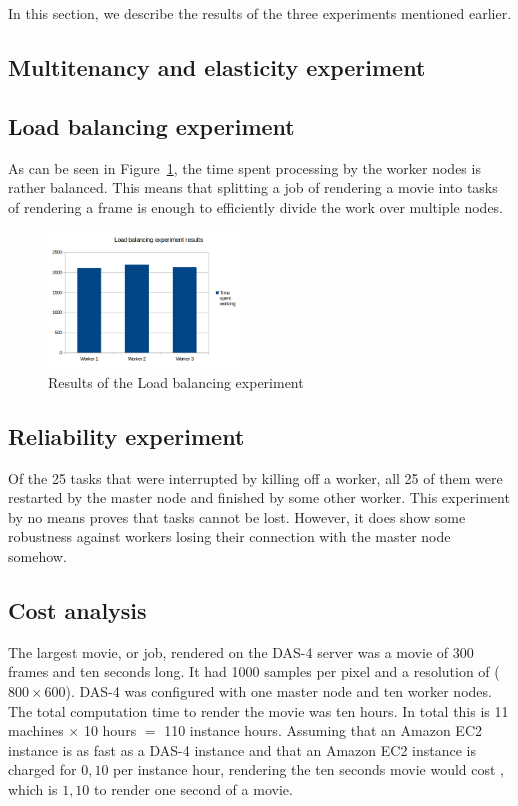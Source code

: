 In this section, we describe the results of the three experiments mentioned earlier.

\subsection{Multitenancy and elasticity experiment}

\subsection{Load balancing experiment}
As can be seen in Figure~\ref{fig:loadbalancingexp}, the time spent processing by the worker nodes is rather balanced.
This means that splitting a job of rendering a movie into tasks of rendering a frame is enough to efficiently divide the work over multiple nodes.

\begin{figure}[ht!]
    \center
    \includegraphics[width=0.45\textwidth]{./img/loadbalancingexp.png}
    \caption{Results of the Load balancing experiment}
    \label{fig:loadbalancingexp}
\end{figure}

\subsection{Reliability experiment}
Of the 25 tasks that were interrupted by killing off a worker, all 25 of them were restarted by the master node and finished by some other worker.
This experiment by no means proves that tasks cannot be lost.
However, it does show some robustness against workers losing their connection with the master node somehow.

\subsection{Cost analysis}
The largest movie, or job, rendered on the DAS-4 server was a movie of 300 frames and ten seconds long.
It had 1000 samples per pixel and a resolution of ($800 \times 600$).
DAS-4 was configured with one master node and ten worker nodes.
The total computation  time to render the movie was ten hours.
In total this is 11 machines $\times$ 10 hours $=$ 110 instance hours.
Assuming that an Amazon EC2 instance is as fast as a DAS-4 instance and that an Amazon EC2 instance is charged for \EUR$0,10$ per instance hour, rendering the ten seconds movie would cost , which is \EUR$1,10$ to render one second of a movie.

